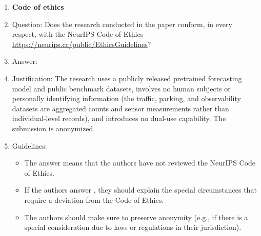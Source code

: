 \begin{enumerate}
\item {\bf Code of ethics}
    \item[] Question: Does the research conducted in the paper conform, in every respect, with the NeurIPS Code of Ethics \url{https://neurips.cc/public/EthicsGuidelines}?
    \item[] Answer: \answerYes{}
    \item[] Justification: The research uses a publicly released pretrained forecasting model and public benchmark datasets, involves no human subjects or personally identifying information (the traffic, parking, and observability datasets are aggregated counts and sensor measurements rather than individual-level records), and introduces no dual-use capability. The submission is anonymized.
    \item[] Guidelines:
    \begin{itemize}
        \item The answer \answerNA{} means that the authors have not reviewed the NeurIPS Code of Ethics.
        \item If the authors answer \answerNo, they should explain the special circumstances that require a deviation from the Code of Ethics.
        \item The authors should make sure to preserve anonymity (e.g., if there is a special consideration due to laws or regulations in their jurisdiction).
    \end{itemize}


\end{enumerate}
